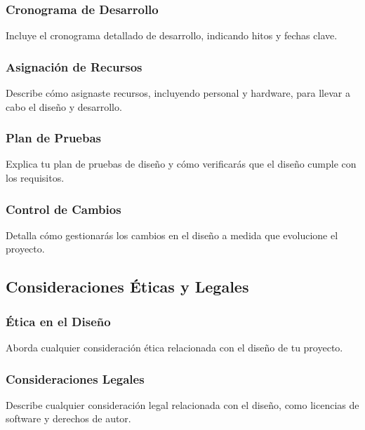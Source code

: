 \subsubsection{Cronograma de Desarrollo}
Incluye el cronograma detallado de desarrollo, indicando hitos y fechas clave.

\subsubsection{Asignación de Recursos}
Describe cómo asignaste recursos, incluyendo personal y hardware, para llevar a cabo el diseño y desarrollo.

\subsubsection{Plan de Pruebas}
Explica tu plan de pruebas de diseño y cómo verificarás que el diseño cumple con los requisitos.

\subsubsection{Control de Cambios}
Detalla cómo gestionarás los cambios en el diseño a medida que evolucione el proyecto.

\subsection{Consideraciones Éticas y Legales}

\subsubsection{Ética en el Diseño}
Aborda cualquier consideración ética relacionada con el diseño de tu proyecto.

\subsubsection{Consideraciones Legales}
Describe cualquier consideración legal relacionada con el diseño, como licencias de software y derechos de autor.

